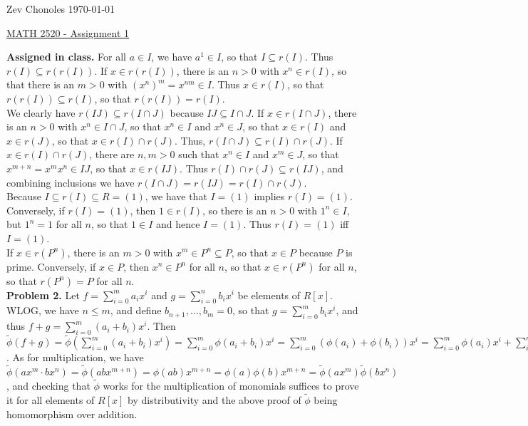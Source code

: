 \documentclass[11pt]{article}
\newcommand{\num}[1]{\noindent \textbf{#1}}
\theoremstyle{definition}
\begin{document}
\noindent Zev Chonoles \hfill \today\\[-0.4in]
\begin{center}
\noindent \underline{MATH 2520 - Assignment 1}
\end{center}

\num{Assigned in class.} For all $a\in I$, we have $a^1\in I$, so that
$ I\subseteq r(I)$. Thus $r(I)\subseteq r(r(I))$. If $x\in r(r(I))$,
there is an $n>0$ with $x^n\in r(I)$, so that there is an $m>0$ with
$(x^n)^m=x^{nm}\in I$. Thus $x\in r(I)$, so that $r(r(I))\subseteq r(I)$,
so that $r(r(I))=r(I)$.\\

We clearly have $r(IJ)\subseteq r(I\cap J)$ because $IJ\subseteq I\cap
J$. If $x\in r(I\cap J)$, there is an $n>0$ with $x^n\in I\cap J$, so that
$x^n\in I$ and $x^n\in J$, so that $x\in r(I)$ and $x\in r(J)$, so that
$x\in r(I)\cap r(J)$. Thus, $r(I\cap J)\subseteq r(I)\cap r(J)$. If $x\in
r(I)\cap r(J)$, there are $n,m>0$ such that $x^n\in I$ and $x^m\in J$, so that
$x^{m+n}=x^mx^n\in IJ$, so that $x\in r(IJ)$. Thus $r(I)\cap r(J)\subseteq
r(IJ)$, and combining inclusions we have $r(I\cap J)=r(IJ)=r(I)\cap r(J)$.\\

Because $I\subseteq r(I)\subseteq R = (1)$, we have that $I=(1)$ implies
$r(I)=(1)$. Conversely, if $r(I)=(1)$, then $1\in r(I)$, so there is an
$n>0$ with $1^n\in I$, but $1^n=1$ for all $n$, so that $1\in I$ and hence
$I=(1)$. Thus $r(I)=(1)$ iff $I=(1)$.\\

If $x\in r(P^n)$, there is an $m>0$ with $x^m\in P^n\subseteq P$, so that
$x\in P$ because $P$ is prime. Conversely, if $x\in P$, then $x^n\in P^n$ for
all $n$, so that $x\in r(P^n)$ for all $n$, so that $r(P^n)=P$ for all $n$.\\

\num{Problem 2.} Let $f=\sum_{i=0}^m a_ix^i$ and $g=\sum_{i=0}^n b_ix^i$ be
elements of $R[x]$. WLOG, we have $n\leq m$, and define $b_{n+1},\ldots,b_m=0$,
so that $g=\sum_{i=0}^m b_ix^i$, and thus $f+g=\sum_{i=0}^m
(a_i+b_i)x^i$. Then $\tilde{\phi}(f+g)=\tilde{\phi}(\sum_{i=0}^m
(a_i+b_i)x^i)=\sum_{i=0}^m\phi(a_i+b_i)x^i=\sum_{i=0}^m(\phi(a_i)+\phi(b_i))x^i=\sum_{i=0}^m\phi(a_i)x^i+\sum_{i=0}^m\phi(b_i)x^i=\tilde{\phi}(f)+\tilde{\phi}(g)$.
As for multiplication, we have $\tilde{\phi}(ax^m\cdot
bx^n)=\tilde{\phi}(abx^{m+n})=\phi(ab)x^{m+n}=\phi(a)\phi(b)x^{m+n}=\tilde{\phi}(ax^m)\tilde{\phi}(bx^n)$,
and checking that $\tilde{\phi}$ works for the multiplication of monomials
suffices to prove it for all elements of $R[x]$ by distributivity and the
above proof of $\tilde{\phi}$ being homomorphism over addition. \\
\end{document}
